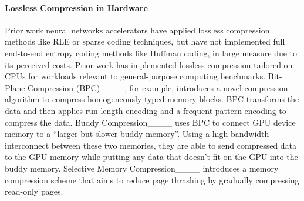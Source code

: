 \paragraph{Lossless Compression in Hardware}
Prior work neural networks accelerators have applied lossless compression 
methods like RLE or sparse coding techniques, but have not implemented full end-to-end entropy coding methods like Huffman coding, in large measure due to its perceived costs. Prior work has implemented lossless compression tailored on CPUs for workloads relevant to general-purpose computing benchmarks.
Bit-Plane Compression (BPC)____, for example, introduces a novel compression algorithm to compress homogeneously typed memory blocks. BPC transforms the data and then applies run-length encoding and a frequent pattern encoding to compress the data. 
Buddy Compression____ uses BPC to connect GPU device memory to a ``larger-but-slower buddy memory''. Using a high-bandwidth interconnect between these two memories, they are able to send compressed data to the GPU memory while putting any data that doesn't fit on the GPU into the buddy memory. Selective Memory Compression____ introduces a memory compression scheme that aims to reduce page thrashing by gradually compressing read-only pages. 





